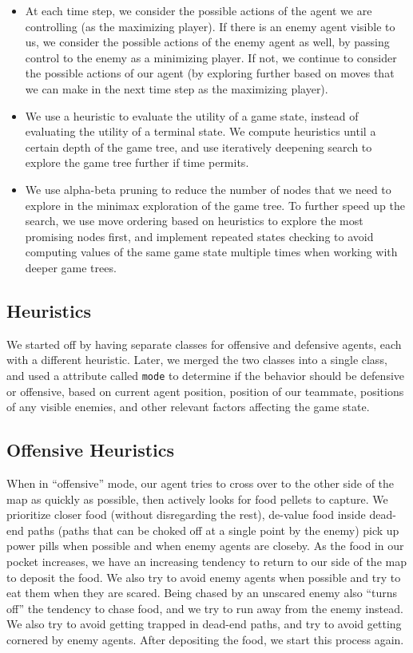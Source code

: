 \documentclass[a4paper,12pt]{article}
\begin{document}
\begin{itemize}
  \item At each time step, we consider the possible actions of the agent we are controlling (as the maximizing player). If there is an enemy agent visible to us, we consider the possible actions of the enemy agent as well, by passing control to the enemy as a minimizing player. If not, we continue to consider the possible actions of our agent (by exploring further based on moves that we can make in the next time step as the maximizing player). %
  \item We use a heuristic to evaluate the utility of a game state, instead of evaluating the utility of a terminal state. We compute heuristics until a certain depth of the game tree, and use iteratively deepening search to explore the game tree further if time permits.
  \item We use alpha-beta pruning to reduce the number of nodes that we need to explore in the minimax exploration of the game tree. To further speed up the search, we use move ordering based on heuristics to explore the most promising nodes first, and implement repeated states checking to avoid computing values of the same game state multiple times when working with deeper game trees.
\end{itemize}

\subsection{Heuristics}
\label{subsec:heuristics}

We started off by having separate classes for offensive and defensive agents, each with a different heuristic. Later, we merged the two classes into a single class, and used a attribute called \texttt{mode} to determine if the behavior should be defensive or offensive, based on current agent position, position of our teammate, positions of any visible enemies, and other relevant factors affecting the game state.

\subsection{Offensive Heuristics}
\label{subsec:offensive_heuristics}
When in ``offensive'' mode, our agent tries to cross over to the other side of the map as quickly as possible, then actively looks for food pellets to capture. We prioritize closer food (without disregarding the rest), de-value food inside dead-end paths (paths that can be choked off at a single point by the enemy) pick up power pills when possible and when enemy agents are closeby. As the food in our pocket increases, we have an increasing tendency to return to our side of the map to deposit the food. We also try to avoid enemy agents when possible and try to eat them when they are scared. Being chased by an unscared enemy also ``turns off'' the tendency to chase food, and we try to run away from the enemy instead. We also try to avoid getting trapped in dead-end paths, and try to avoid getting cornered by enemy agents. After depositing the food, we start this process again.
\end{document}
